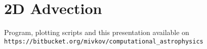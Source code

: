 \section{2D Advection}










\begin{frame}[fragile]
	Program, plotting scripts and this presentation available on \verb!https://bitbucket.org/mivkov/computational_astrophysics!
\end{frame}














